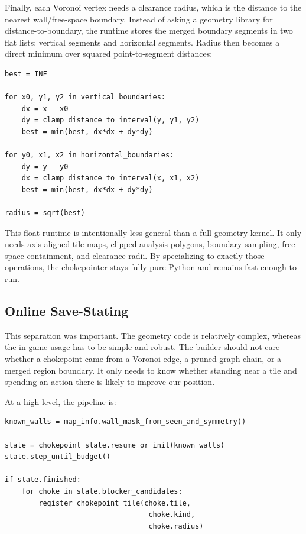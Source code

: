 \documentclass[10pt,sigconf,nonacm]{acmart}
\begin{document}
Finally, each Voronoi vertex needs a clearance radius, which is the
distance to the nearest wall/free-space boundary. Instead of asking a
geometry library for distance-to-boundary, the runtime stores the merged
boundary segments in two flat lists: vertical segments and horizontal
segments. Radius then becomes a direct minimum over squared point-to-segment
distances:

\begin{lstlisting}
best = INF

for x0, y1, y2 in vertical_boundaries:
    dx = x - x0
    dy = clamp_distance_to_interval(y, y1, y2)
    best = min(best, dx*dx + dy*dy)

for y0, x1, x2 in horizontal_boundaries:
    dy = y - y0
    dx = clamp_distance_to_interval(x, x1, x2)
    best = min(best, dx*dx + dy*dy)

radius = sqrt(best)
\end{lstlisting}

This float runtime is intentionally less general than a full geometry
kernel. It only needs axis-aligned tile maps, clipped analysis polygons,
boundary sampling, free-space containment, and clearance radii. By
specializing to exactly those operations, the chokepointer stays fully
pure Python and remains fast enough to run.

\subsection{Online Save-Stating}
This separation was important. The geometry code is relatively complex,
whereas the in-game usage has to be simple and robust. The builder should
not care whether a chokepoint came from a Voronoi edge, a pruned graph
chain, or a merged region boundary. It only needs to know whether standing
near a tile and spending an action there is likely to improve our position.

At a high level, the pipeline is:

\begin{lstlisting}
known_walls = map_info.wall_mask_from_seen_and_symmetry()

state = chokepoint_state.resume_or_init(known_walls)
state.step_until_budget()

if state.finished:
    for choke in state.blocker_candidates:
        register_chokepoint_tile(choke.tile,
                                  choke.kind,
                                  choke.radius)
\end{lstlisting}
\end{document}
